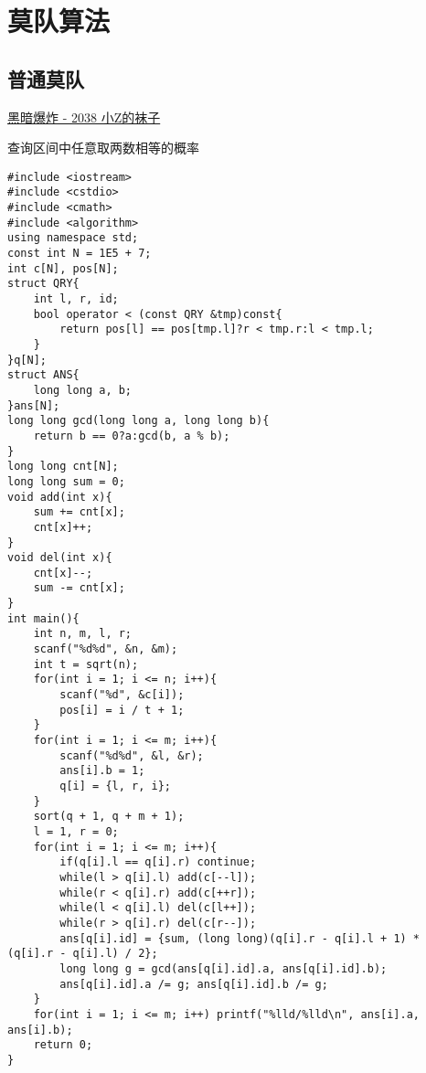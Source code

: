 \section{莫队算法}
\subsection{普通莫队}
	\href{https://darkbzoj.tk/problem/2038}{黑暗爆炸 - 2038 小Z的袜子} \par
	查询区间中任意取两数相等的概率
	\begin{lstlisting}
#include <iostream>
#include <cstdio>
#include <cmath>
#include <algorithm>
using namespace std;
const int N = 1E5 + 7;
int c[N], pos[N];
struct QRY{
    int l, r, id;
    bool operator < (const QRY &tmp)const{
        return pos[l] == pos[tmp.l]?r < tmp.r:l < tmp.l;
    }
}q[N];
struct ANS{
    long long a, b;
}ans[N];
long long gcd(long long a, long long b){
    return b == 0?a:gcd(b, a % b);
}
long long cnt[N];
long long sum = 0;
void add(int x){
    sum += cnt[x];
    cnt[x]++;
}
void del(int x){
    cnt[x]--;
    sum -= cnt[x];
}
int main(){
    int n, m, l, r;
    scanf("%d%d", &n, &m);
    int t = sqrt(n);
    for(int i = 1; i <= n; i++){
        scanf("%d", &c[i]);
        pos[i] = i / t + 1;
    }
    for(int i = 1; i <= m; i++){
        scanf("%d%d", &l, &r);
        ans[i].b = 1;
        q[i] = {l, r, i};
    }
    sort(q + 1, q + m + 1);
    l = 1, r = 0;
    for(int i = 1; i <= m; i++){
        if(q[i].l == q[i].r) continue;
        while(l > q[i].l) add(c[--l]);
        while(r < q[i].r) add(c[++r]);
        while(l < q[i].l) del(c[l++]);
        while(r > q[i].r) del(c[r--]);
        ans[q[i].id] = {sum, (long long)(q[i].r - q[i].l + 1) * (q[i].r - q[i].l) / 2};
        long long g = gcd(ans[q[i].id].a, ans[q[i].id].b);
        ans[q[i].id].a /= g; ans[q[i].id].b /= g;
    }
    for(int i = 1; i <= m; i++) printf("%lld/%lld\n", ans[i].a, ans[i].b);
    return 0;
}\end{lstlisting}
